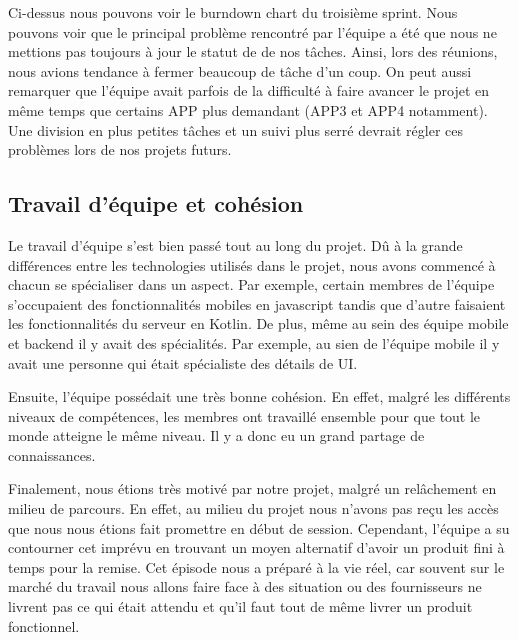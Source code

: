     Ci-dessus nous pouvons voir le burndown chart du troisième sprint. Nous pouvons voir que le principal problème rencontré par l'équipe a été que nous ne mettions pas toujours à jour le statut de de nos tâches. Ainsi, lors des réunions, nous avions tendance à fermer beaucoup de tâche d'un coup. On peut aussi remarquer que l'équipe avait parfois de la difficulté à faire avancer le projet en même temps que certains APP plus demandant (APP3 et APP4 notamment). Une division en plus petites tâches et un suivi plus serré devrait régler ces problèmes lors de nos projets futurs.

    \subsection{Travail d'équipe et cohésion}
    Le travail d'équipe s'est bien passé tout au long du projet. Dû à la grande différences entre les technologies utilisés dans le projet, nous avons commencé à chacun se spécialiser dans un aspect. Par exemple, certain membres de l'équipe s'occupaient des fonctionnalités mobiles en javascript tandis que d'autre faisaient les fonctionnalités du serveur en Kotlin. De plus, même au sein des équipe mobile et backend il y avait des spécialités. Par exemple, au sien de l'équipe mobile il y avait une personne qui était spécialiste des détails de UI.

    Ensuite, l'équipe possédait une très bonne cohésion. En effet, malgré les différents niveaux de compétences, les membres ont travaillé ensemble pour que tout le monde atteigne le même niveau. Il y a donc eu un grand partage de connaissances.

    Finalement, nous étions très motivé par notre projet, malgré un relâchement en milieu de parcours. En effet, au milieu du projet nous n'avons pas reçu les accès que nous nous étions fait promettre en début de session. Cependant, l'équipe a su contourner cet imprévu en trouvant un moyen alternatif d'avoir un produit fini à temps pour la remise. Cet épisode nous a préparé à la vie réel, car souvent sur le marché du travail nous allons faire face à des situation ou des fournisseurs ne livrent pas ce qui était attendu et qu'il faut tout de même livrer un produit fonctionnel.
    